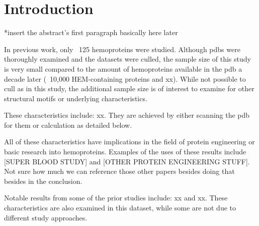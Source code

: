 \chapter{Introduction}
	
	*insert the abstract's first paragraph basically here later
	
	In previous work, only ~125 hemoproteins were studied. Although pdbs were thoroughly examined and the datasets were culled, the sample size of this study is very small compared to the amount of hemoproteins available in the pdb a decade later (~10,000 HEM-containing proteins and xx). While not possible to cull as in this study, the additional sample size is of interest to examine for other structural motifs or underlying characteristics.
	
	These characteristics include: xx. They are achieved by either scanning the pdb for them or calculation as detailed below. 
	
	All of these characteristics have implications in the field of protein engineering or basic research into hemoproteins. Examples of the uses of these results include [SUPER BLOOD STUDY] and [OTHER PROTEIN ENGINEERING STUFF]. Not sure how much we can reference those other papers besides doing that besides in the conclusion.
	
	Notable results from some of the prior studies include: xx and xx. These characteristics are also examined in this dataset, while some are not due to different study approaches. 
